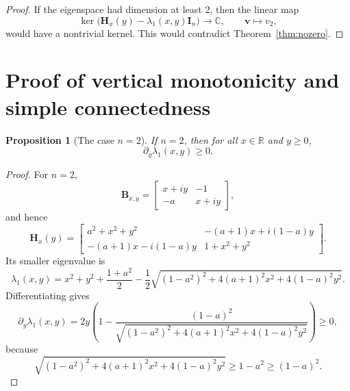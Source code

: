 \documentclass[11pt]{article}
\numberwithin{equation}{section}
\newtheorem{proposition}[theorem]{Proposition}
\newcommand{\R}{\mathbb R}
\newcommand{\C}{\mathbb C}
\newcommand{\I}{\mathbf I}
\newcommand{\Bmat}{\mathbf B}
\newcommand{\Hmat}{\mathbf H}
\begin{document}
\begin{proof}
If the eigenspace had dimension at least \(2\), then the linear map
\[
\ker\bigl(\Hmat_x(y)-\lambda_1(x,y)\I_n\bigr)\longrightarrow\C,
\qquad
\bm v\longmapsto v_2,
\]
would have a nontrivial kernel.  This would contradict
Theorem~\ref{thm:nozero}.
\end{proof}

\section{Proof of vertical monotonicity and simple connectedness}
\label{sec:proof-vertical}

\begin{proposition}[The case \(n=2\)]\label{prop:n2}
If \(n=2\), then for all \(x\in\R\) and \(y\ge0\),
\[
\partial_y\lambda_1(x,y)\ge0.
\]
\end{proposition}

\begin{proof}
For \(n=2\),
\[
\Bmat_{x,y}
=
\begin{bmatrix}
x+iy & -1\\
-a & x+iy
\end{bmatrix},
\]
and hence
\[
\Hmat_x(y)
=
\begin{bmatrix}
a^2+x^2+y^2 & -(a+1)x+i(1-a)y\\
-(a+1)x-i(1-a)y & 1+x^2+y^2
\end{bmatrix}.
\]
Its smaller eigenvalue is
\[
\lambda_1(x,y)
=
x^2+y^2+\frac{1+a^2}{2}
-\frac12\sqrt{(1-a^2)^2+4(a+1)^2x^2+4(1-a)^2y^2}.
\]
Differentiating gives
\[
\partial_y\lambda_1(x,y)
=
2y\left(
1-\frac{(1-a)^2}
{\sqrt{(1-a^2)^2+4(a+1)^2x^2+4(1-a)^2y^2}}
\right)\ge0,
\]
because
\[
\sqrt{(1-a^2)^2+4(a+1)^2x^2+4(1-a)^2y^2}\ge 1-a^2\ge (1-a)^2.
\]
\end{proof}
\end{document}

